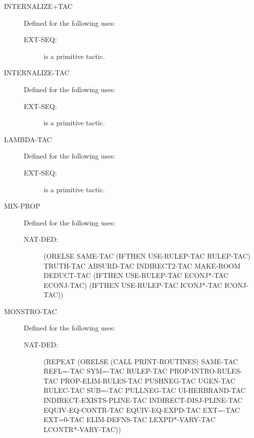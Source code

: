 \begin{description}
\begin{description}
\end{description}

\item[INTERNALIZE+TAC]  Defined for the following uses:
\begin{description}
\item[EXT-SEQ:]  is a primitive tactic.

\end{description}

\item[INTERNALIZE-TAC]  Defined for the following uses:
\begin{description}
\item[EXT-SEQ:]  is a primitive tactic.

\end{description}

\item[LAMBDA-TAC]  Defined for the following uses:
\begin{description}
\item[EXT-SEQ:]  is a primitive tactic.

\end{description}

\item[MIN-PROP]  Defined for the following uses:
\begin{description}
\item[NAT-DED:] 
(ORELSE SAME-TAC (IFTHEN USE-RULEP-TAC RULEP-TAC) TRUTH-TAC ABSURD-TAC
 INDIRECT2-TAC MAKE-ROOM DEDUCT-TAC
 (IFTHEN USE-RULEP-TAC ECONJ*-TAC ECONJ-TAC)
 (IFTHEN USE-RULEP-TAC ICONJ*-TAC ICONJ-TAC))


\end{description}

\item[MONSTRO-TAC]  Defined for the following uses:
\begin{description}
\item[NAT-DED:] 
(REPEAT
 (ORELSE (CALL PRINT-ROUTINES) SAME-TAC REFL=-TAC SYM=-TAC RULEP-TAC
  PROP-INTRO-RULES-TAC PROP-ELIM-RULES-TAC PUSHNEG-TAC UGEN-TAC
  RULEC-TAC SUB=-TAC PULLNEG-TAC UI-HERBRAND-TAC
  INDIRECT-EXISTS-PLINE-TAC INDIRECT-DISJ-PLINE-TAC EQUIV-EQ-CONTR-TAC
  EQUIV-EQ-EXPD-TAC EXT=-TAC EXT=0-TAC ELIM-DEFNS-TAC LEXPD*-VARY-TAC
  LCONTR*-VARY-TAC))



\end{description}
\end{description}
